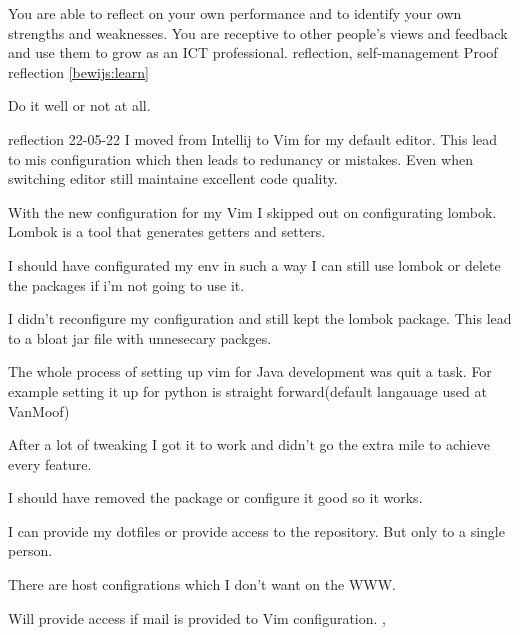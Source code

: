 \competentie
{%
	\competentieformulier
	{%
		You are able to reflect on your own performance and to identify your own strengths and weaknesses. You are receptive to other people's views and feedback and use them to grow as an ICT professional.
	}
	{%
		reflection,%
		self-management%
	}
	{%
		Proof
	}
	{%
		reflection
	}
	{%
		\ref{bewijs:learn}
	}
}
{%
	\bewijs
	{
		Do it well or not at all.
	}
	{%
		\starr
		{%
			reflection
		}
		{%
			22-05-22
		}
		{%
			I moved from Intellij to Vim for my default editor.
			This lead to mis configuration which then leads to redunancy or mistakes.
		}
		{%
			Even when switching editor still maintaine excellent code quality.
		}
		{%
			With the new configuration for my Vim I skipped out on configurating lombok.
			Lombok is a tool that generates getters and setters.


			I should have configurated my env in such a way I can still use lombok or delete the packages if i'm not going to use it.

		}
		{%
			I didn't reconfigure my configuration and still kept the lombok package.
			This lead to a bloat jar file with unnesecary packges.
		}
		{%
			The whole process of setting up vim for Java development was quit a task.
			For example setting it up for python is straight forward(default langauage used at VanMoof)

			After a lot of tweaking I got it to work and didn't go the extra mile to achieve every feature.

			I should have removed the package or configure it good so it works.
		}
		{
			I can provide my dotfiles or provide access to the repository.
			But only to a single person.

			There are host configrations which I don't want on the WWW.
		}
	}
	{%
		\label{bewijs:learn}
		Will provide access if mail is provided to Vim configuration.
	},
}
